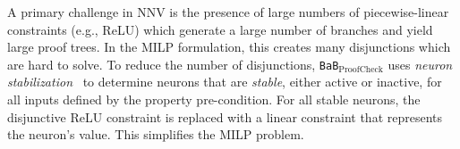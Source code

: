 \documentclass[oneside,11pt,dvipsnames]{book}
\numberwithin{equation}{section}
\theoremstyle{definition}
\theoremstyle{remark}
\newcommand{\proofcheck}{\texttt{BaB$_{\text{ProofCheck}}$}}
\begin{document}






A primary challenge in NNV is the presence of large numbers of piecewise-linear constraints (e.g., ReLU) which generate a large number of branches and yield large proof trees. In the MILP formulation, this creates many disjunctions which are hard to solve. To reduce the number of disjunctions, \proofcheck{} uses \emph{neuron stabilization}~\cite{duong2024harnessing}
to determine neurons that are \emph{stable}, either active or inactive, for all inputs defined by the property pre-condition.
For all stable neurons, the disjunctive ReLU constraint is replaced with a linear constraint that represents the neuron's value.   This simplifies the MILP problem.
\end{document}
